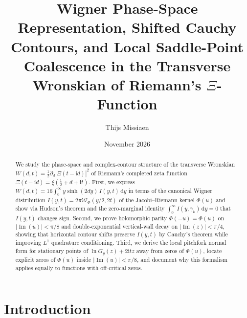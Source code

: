 \documentclass[11pt,a4paper,reqno]{amsart}
\title[Wigner Phase-Space and Shifted Contours for Riemann's $\Xi$-Function]{Wigner Phase-Space Representation, Shifted Cauchy Contours, and Local Saddle-Point Coalescence in the Transverse Wronskian of Riemann's $\Xi$-Function}
\author{Thijs Missiaen}
\date{November 2026}
\theoremstyle{definition}
\theoremstyle{remark}
\numberwithin{equation}{section}
\newcommand{\dd}{\mathrm{d}}
\newcommand{\ii}{\mathrm{i}}
\newcommand{\Ima}{\operatorname{Im}}
\newcommand{\Wig}{\mathcal{W}}
\begin{document}
\begin{abstract}
We study the phase-space and complex-contour structure of the transverse Wronskian $W(d,t) = \frac{1}{2}\partial_d|\Xi(t-\ii d)|^2$ of Riemann's completed zeta function $\Xi(t-\ii d) = \xi(\frac{1}{2}+d+\ii t)$. First, we express $W(d,t) = 16\int_0^\infty y\sinh(2d y)\,I(y,t)\,\dd y$ in terms of the canonical Wigner distribution $I(y,t) = 2\pi\Wig_\Phi(y/2, 2t)$ of the Jacobi--Riemann kernel $\Phi(u)$ and show via Hudson's theorem and the zero-marginal identity $\int_0^\infty I(y,\gamma_k)\,\dd y = 0$ that $I(y,t)$ changes sign. Second, we prove holomorphic parity $\Phi(-u)=\Phi(u)$ on $|\Ima(u)| < \pi/8$ and double-exponential vertical-wall decay on $|\Ima(z)| < \pi/4$, showing that horizontal contour shifts preserve $I(y,t)$ by Cauchy's theorem while improving $L^1$ quadrature conditioning. Third, we derive the local pitchfork normal form for stationary points of $\ln G_y(z) + 2\ii t z$ away from zeros of $\Phi(u)$, locate explicit zeros of $\Phi(u)$ inside $|\Ima(u)| < \pi/8$, and document why this formalism applies equally to functions with off-critical zeros.
\end{abstract}

\maketitle

\section{Introduction}\label{sec:intro}
\end{document}
